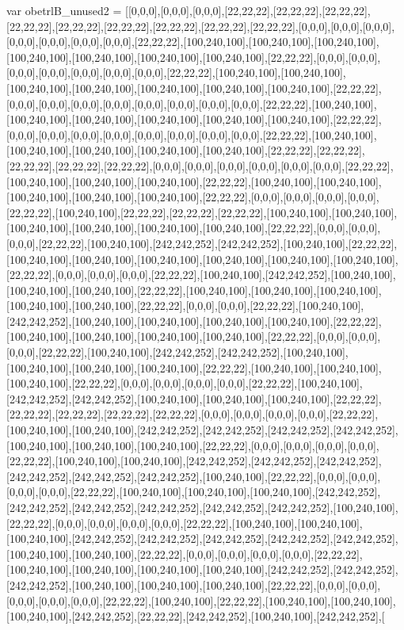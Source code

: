 var obetrlB_unused2 = [[0,0,0],[0,0,0],[0,0,0],[22,22,22],[22,22,22],[22,22,22],[22,22,22],[22,22,22],[22,22,22],[22,22,22],[22,22,22],[22,22,22],[0,0,0],[0,0,0],[0,0,0],[0,0,0],[0,0,0],[0,0,0],[0,0,0],[22,22,22],[100,240,100],[100,240,100],[100,240,100],[100,240,100],[100,240,100],[100,240,100],[100,240,100],[22,22,22],[0,0,0],[0,0,0],[0,0,0],[0,0,0],[0,0,0],[0,0,0],[0,0,0],[22,22,22],[100,240,100],[100,240,100],[100,240,100],[100,240,100],[100,240,100],[100,240,100],[100,240,100],[22,22,22],[0,0,0],[0,0,0],[0,0,0],[0,0,0],[0,0,0],[0,0,0],[0,0,0],[0,0,0],[22,22,22],[100,240,100],[100,240,100],[100,240,100],[100,240,100],[100,240,100],[100,240,100],[22,22,22],[0,0,0],[0,0,0],[0,0,0],[0,0,0],[0,0,0],[0,0,0],[0,0,0],[0,0,0],[22,22,22],[100,240,100],[100,240,100],[100,240,100],[100,240,100],[100,240,100],[22,22,22],[22,22,22],[22,22,22],[22,22,22],[22,22,22],[0,0,0],[0,0,0],[0,0,0],[0,0,0],[0,0,0],[0,0,0],[22,22,22],[100,240,100],[100,240,100],[100,240,100],[22,22,22],[100,240,100],[100,240,100],[100,240,100],[100,240,100],[100,240,100],[22,22,22],[0,0,0],[0,0,0],[0,0,0],[0,0,0],[22,22,22],[100,240,100],[22,22,22],[22,22,22],[22,22,22],[100,240,100],[100,240,100],[100,240,100],[100,240,100],[100,240,100],[100,240,100],[22,22,22],[0,0,0],[0,0,0],[0,0,0],[22,22,22],[100,240,100],[242,242,252],[242,242,252],[100,240,100],[22,22,22],[100,240,100],[100,240,100],[100,240,100],[100,240,100],[100,240,100],[100,240,100],[22,22,22],[0,0,0],[0,0,0],[0,0,0],[22,22,22],[100,240,100],[242,242,252],[100,240,100],[100,240,100],[100,240,100],[22,22,22],[100,240,100],[100,240,100],[100,240,100],[100,240,100],[100,240,100],[22,22,22],[0,0,0],[0,0,0],[22,22,22],[100,240,100],[242,242,252],[100,240,100],[100,240,100],[100,240,100],[100,240,100],[22,22,22],[100,240,100],[100,240,100],[100,240,100],[100,240,100],[22,22,22],[0,0,0],[0,0,0],[0,0,0],[22,22,22],[100,240,100],[242,242,252],[242,242,252],[100,240,100],[100,240,100],[100,240,100],[100,240,100],[22,22,22],[100,240,100],[100,240,100],[100,240,100],[22,22,22],[0,0,0],[0,0,0],[0,0,0],[0,0,0],[22,22,22],[100,240,100],[242,242,252],[242,242,252],[100,240,100],[100,240,100],[100,240,100],[22,22,22],[22,22,22],[22,22,22],[22,22,22],[22,22,22],[0,0,0],[0,0,0],[0,0,0],[0,0,0],[22,22,22],[100,240,100],[100,240,100],[242,242,252],[242,242,252],[242,242,252],[242,242,252],[100,240,100],[100,240,100],[100,240,100],[22,22,22],[0,0,0],[0,0,0],[0,0,0],[0,0,0],[22,22,22],[100,240,100],[100,240,100],[242,242,252],[242,242,252],[242,242,252],[242,242,252],[242,242,252],[242,242,252],[100,240,100],[22,22,22],[0,0,0],[0,0,0],[0,0,0],[0,0,0],[22,22,22],[100,240,100],[100,240,100],[100,240,100],[242,242,252],[242,242,252],[242,242,252],[242,242,252],[242,242,252],[242,242,252],[100,240,100],[22,22,22],[0,0,0],[0,0,0],[0,0,0],[0,0,0],[22,22,22],[100,240,100],[100,240,100],[100,240,100],[242,242,252],[242,242,252],[242,242,252],[242,242,252],[242,242,252],[100,240,100],[100,240,100],[22,22,22],[0,0,0],[0,0,0],[0,0,0],[0,0,0],[22,22,22],[100,240,100],[100,240,100],[100,240,100],[100,240,100],[242,242,252],[242,242,252],[242,242,252],[100,240,100],[100,240,100],[100,240,100],[22,22,22],[0,0,0],[0,0,0],[0,0,0],[0,0,0],[0,0,0],[22,22,22],[100,240,100],[22,22,22],[100,240,100],[100,240,100],[100,240,100],[242,242,252],[22,22,22],[242,242,252],[100,240,100],[242,242,252],[